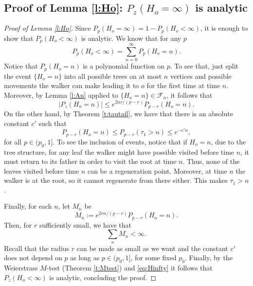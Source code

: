 \documentclass[a4paper]{amsart}
\begin{document}
\subsection{Proof of Lemma \ref{l:Ho}: $P_z(H_o = \infty)$ is analytic}



\begin{proof}[Proof of Lemma \ref{l:Ho}]Since $P_p(H_o = \infty) = 1 - P_p(H_o < \infty)$, it is enough to show that $P_p(H_o < \infty)$ is analytic. We know that for any $p$
\begin{equation}\label{eq:Hinfty}
    P_{p}(H_o < \infty) = \sum_{n=0}^\infty P_{p}(H_o = n).
\end{equation}
Notice that $P_{p}(H_o = n)$ is a polynomial function on $p$. To see that, just split the event $\{H_o = n\}$ into all possible trees on at most $n$ vertices and possible movements the walker can make leading it to $o$ for the first time at time $n$. Moreover, by Lemma \ref{l:An} applied to $\{H_o = n \} \in \mathcal{F}_n$, it follows that
\begin{equation}
    |P_z(H_o = n)| \le e^{2nr/(p-r)}P_{p-r}(H_o = n).
\end{equation}
On the other hand, by Theorem \ref{t:tautail}, we have that there is an absolute constant $c'$ such that
\begin{equation}\label{ineq:Hn}
    P_{p-r}(H_o = n) \le P_{p-r}(\tau_1 >  n)  \le e^{-c'n},
\end{equation}
for all $p\in (p_0,1]$. To see the inclusion of events, notice that if $H_o = n$, due to the tree structure, for any leaf the walker might have possible visited before time $n$, it must return to its father in order to visit the root at time $n$. Thus, none of the leaves visited before time $n$ can be a regeneration point. Moreover, at time $n$ the walker is at the root, so it cannot regenerate from there either. This makes $\tau_1  > n$. 

Finally, for each $n$, let $M_n$ be 
$$
M_n := e^{2rn/(p-r)}P_{p-r}(H_o = n).
$$
Then, for $r$ sufficiently small, we have that
\begin{equation}
    \sum_n M_n < \infty.
\end{equation}
Recall that the radius $r$ can be made as small as we want and the constant $c'$ does not depend on $p$ as long as $p \in (p_0,1]$, for some fixed $p_0$. Finally, by the Weierstrass $M$-test (Theorem \ref{t:Mtest}) and \eqref{eq:Hinfty} it follows that $P_z(H_o < \infty)$ is analytic, concluding the proof.

\end{proof}
\end{document}
